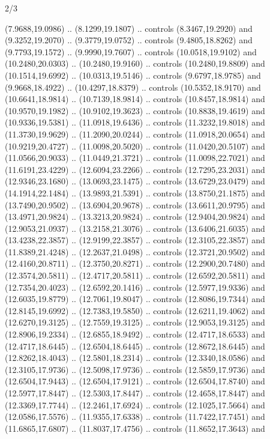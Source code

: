 \begin{flagdescription}{2/3}
\begin{scope}[yshift=\flagwidth,scale=\flagwidth/1241.93737]
\begin{scope}[y=-1mm, x=1mm,draw=gold,fill=blue,line join=miter,miter limit=4,line width=1.8\lw]
{  (7.9688,19.0986) .. (8.1299,19.1807) .. controls (8.3467,19.2920) and
  (9.3252,19.2070) .. (9.3779,19.0752) .. controls (9.4805,18.8262) and
  (9.7793,19.1572) .. (9.9990,19.7607) .. controls (10.0518,19.9102) and
  (10.2480,20.0303) .. (10.2480,19.9160) .. controls (10.2480,19.8809) and
  (10.1514,19.6992) .. (10.0313,19.5146) .. controls (9.6797,18.9785) and
  (9.9668,18.4922) .. (10.4297,18.8379) .. controls (10.5352,18.9170) and
  (10.6641,18.9814) .. (10.7139,18.9814) .. controls (10.8457,18.9814) and
  (10.9570,19.1982) .. (10.9102,19.3623) .. controls (10.8838,19.4619) and
  (10.9336,19.5381) .. (11.0918,19.6436) .. controls (11.3232,19.8018) and
  (11.3730,19.9629) .. (11.2090,20.0244) .. controls (11.0918,20.0654) and
  (10.9219,20.4727) .. (11.0098,20.5020) .. controls (11.0420,20.5107) and
  (11.0566,20.9033) .. (11.0449,21.3721) .. controls (11.0098,22.7021) and
  (11.6191,23.4229) .. (12.6094,23.2266) .. controls (12.7295,23.2031) and
  (12.9346,23.1680) .. (13.0693,23.1475) .. controls (13.6729,23.0479) and
  (14.1914,22.1484) .. (13.9893,21.5391) .. controls (13.8750,21.1875) and
  (13.7490,20.9502) .. (13.6904,20.9678) .. controls (13.6611,20.9795) and
  (13.4971,20.9824) .. (13.3213,20.9824) .. controls (12.9404,20.9824) and
  (12.9053,21.0937) .. (13.2158,21.3076) .. controls (13.6406,21.6035) and
  (13.4238,22.3857) .. (12.9199,22.3857) .. controls (12.3105,22.3857) and
  (11.8389,21.4248) .. (12.2637,21.0498) .. controls (12.3721,20.9502) and
  (12.4160,20.8711) .. (12.3750,20.8271) .. controls (12.2900,20.7480) and
  (12.3574,20.5811) .. (12.4717,20.5811) .. controls (12.6592,20.5811) and
  (12.7354,20.4023) .. (12.6592,20.1416) .. controls (12.5977,19.9336) and
  (12.6035,19.8779) .. (12.7061,19.8047) .. controls (12.8086,19.7344) and
  (12.8145,19.6992) .. (12.7383,19.5850) .. controls (12.6211,19.4062) and
  (12.6270,19.3125) .. (12.7559,19.3125) .. controls (12.9053,19.3125) and
  (12.8906,19.2334) .. (12.6855,18.9492) .. controls (12.4717,18.6533) and
  (12.4717,18.6445) .. (12.6504,18.6445) .. controls (12.8672,18.6445) and
  (12.8262,18.4043) .. (12.5801,18.2314) .. controls (12.3340,18.0586) and
  (12.3105,17.9736) .. (12.5098,17.9736) .. controls (12.5859,17.9736) and
  (12.6504,17.9443) .. (12.6504,17.9121) .. controls (12.6504,17.8740) and
  (12.5977,17.8447) .. (12.5303,17.8447) .. controls (12.4658,17.8447) and
  (12.3369,17.7744) .. (12.2461,17.6924) .. controls (12.1025,17.5664) and
  (12.0586,17.5576) .. (11.9355,17.6338) .. controls (11.7422,17.7451) and
  (11.6865,17.6807) .. (11.8037,17.4756) .. controls (11.8652,17.3643) and
}
\end{scope}
\end{scope}
\end{flagdescription}
